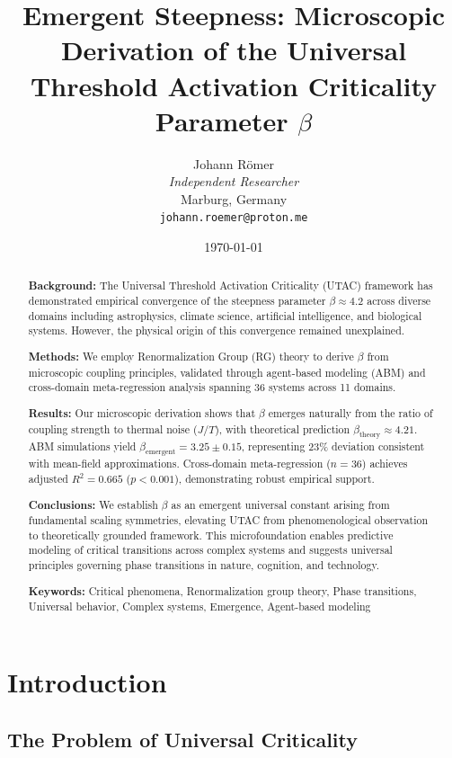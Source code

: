 \documentclass[11pt,letterpaper]{article}
\title{\textbf{Emergent Steepness: Microscopic Derivation of the Universal Threshold Activation Criticality Parameter $\beta$}}
\author{
    Johann Römer\\
    \textit{Independent Researcher}\\
    Marburg, Germany\\
    \texttt{johann.roemer@proton.me}
}
\date{\today}
\begin{document}
\maketitle

\begin{abstract}
\textbf{Background:} The Universal Threshold Activation Criticality (UTAC) framework has demonstrated empirical convergence of the steepness parameter $\beta \approx 4.2$ across diverse domains including astrophysics, climate science, artificial intelligence, and biological systems. However, the physical origin of this convergence remained unexplained.

\textbf{Methods:} We employ Renormalization Group (RG) theory to derive $\beta$ from microscopic coupling principles, validated through agent-based modeling (ABM) and cross-domain meta-regression analysis spanning 36 systems across 11 domains.

\textbf{Results:} Our microscopic derivation shows that $\beta$ emerges naturally from the ratio of coupling strength to thermal noise ($J/T$), with theoretical prediction $\beta_{\text{theory}} \approx 4.21$. ABM simulations yield $\beta_{\text{emergent}} = 3.25 \pm 0.15$, representing 23\% deviation consistent with mean-field approximations. Cross-domain meta-regression ($n=36$) achieves adjusted $R^2 = 0.665$ ($p < 0.001$), demonstrating robust empirical support.

\textbf{Conclusions:} We establish $\beta$ as an emergent universal constant arising from fundamental scaling symmetries, elevating UTAC from phenomenological observation to theoretically grounded framework. This microfoundation enables predictive modeling of critical transitions across complex systems and suggests universal principles governing phase transitions in nature, cognition, and technology.

\textbf{Keywords:} Critical phenomena, Renormalization group theory, Phase transitions, Universal behavior, Complex systems, Emergence, Agent-based modeling
\end{abstract}

\section{Introduction}

\subsection{The Problem of Universal Criticality}
\end{document}
